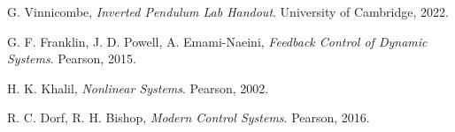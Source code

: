 \documentclass{article}
\begin{document}
\newpage
\begin{thebibliography}{9}

  G. Vinnicombe,
  \emph{Inverted Pendulum Lab Handout}.
  University of Cambridge,
  2022.

  G. F. Franklin, J. D. Powell, A. Emami-Naeini,
  \emph{Feedback Control of Dynamic Systems}.
  Pearson,
  2015.

  H. K. Khalil,
  \emph{Nonlinear Systems}.
  Pearson,
  2002.

  R. C. Dorf, R. H. Bishop,
  \emph{Modern Control Systems}.
  Pearson,
  2016.

\end{thebibliography}
\end{document}
